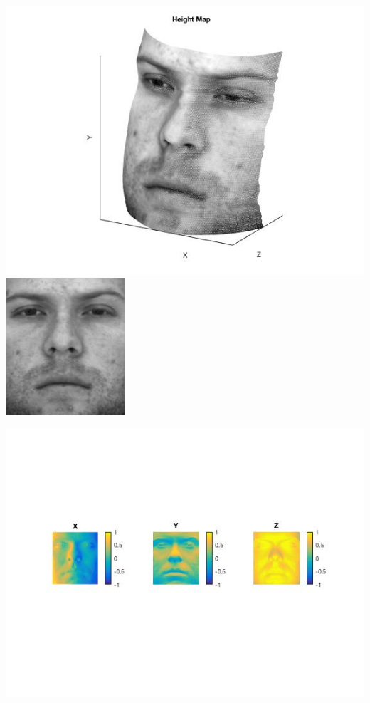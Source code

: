 \documentclass[fleqn]{article}
\begin{document}
\vspace{10 mm}
\includegraphics{yaleB01.jpg}
\newpage
\includegraphics{yaleB01_albedo.jpg}

\includegraphics{a1.jpg}
\end{document}
